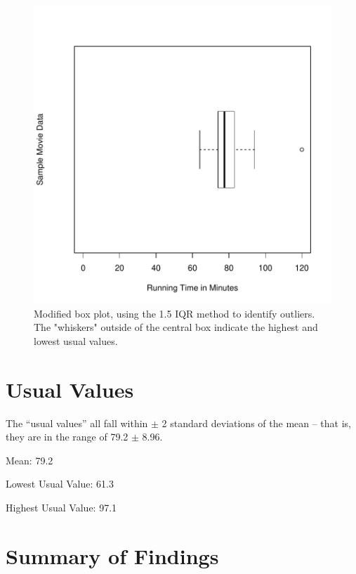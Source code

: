 \documentclass[twocolumn,english]{IEEEtran}
\theoremstyle{plain}
\theoremstyle{plain}
\begin{document}
\begin{figure}[H]
\begin{centering}
\includegraphics{proj1-boxplot1}
\caption{Modified box plot, using the 1.5 IQR method to identify outliers. The "whiskers" outside of the central box indicate the highest and lowest usual values.}
\label{fig:one}
\end{centering}
\end{figure}

\section{Usual Values}
The ``usual values'' all fall within $\pm$ 2 standard deviations of the mean -- that is, they are in the range of 79.2 $\pm$ 8.96.


\begin{Schunk}
\begin{Soutput}
Mean:  79.2
\end{Soutput}
\begin{Soutput}
Lowest Usual Value:  61.3
\end{Soutput}
\begin{Soutput}
Highest Usual Value:  97.1
\end{Soutput}
\end{Schunk}
\section{Summary of Findings}

%
%
\end{document}
